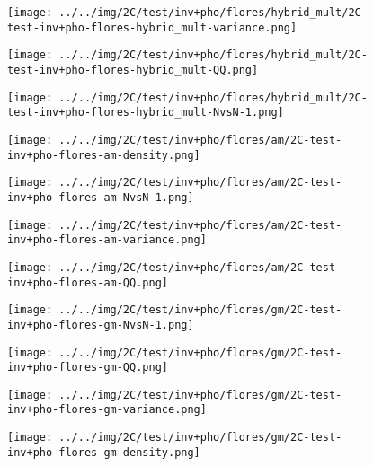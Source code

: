 \begin{figure}[H]
\centering	\texttt{[image: ../../img/2C/test/inv+pho/flores/hybrid\_mult/2C-test-inv+pho-flores-hybrid\_mult-variance.png]}
\end{figure}
\begin{figure}[H]
\centering	\texttt{[image: ../../img/2C/test/inv+pho/flores/hybrid\_mult/2C-test-inv+pho-flores-hybrid\_mult-QQ.png]}
\end{figure}
\begin{figure}[H]
\centering	\texttt{[image: ../../img/2C/test/inv+pho/flores/hybrid\_mult/2C-test-inv+pho-flores-hybrid\_mult-NvsN-1.png]}
\end{figure}
\begin{figure}[H]
\centering	\texttt{[image: ../../img/2C/test/inv+pho/flores/am/2C-test-inv+pho-flores-am-density.png]}
\end{figure}
\begin{figure}[H]
\centering	\texttt{[image: ../../img/2C/test/inv+pho/flores/am/2C-test-inv+pho-flores-am-NvsN-1.png]}
\end{figure}
\begin{figure}[H]
\centering	\texttt{[image: ../../img/2C/test/inv+pho/flores/am/2C-test-inv+pho-flores-am-variance.png]}
\end{figure}
\begin{figure}[H]
\centering	\texttt{[image: ../../img/2C/test/inv+pho/flores/am/2C-test-inv+pho-flores-am-QQ.png]}
\end{figure}
\begin{figure}[H]
\centering	\texttt{[image: ../../img/2C/test/inv+pho/flores/gm/2C-test-inv+pho-flores-gm-NvsN-1.png]}
\end{figure}
\begin{figure}[H]
\centering	\texttt{[image: ../../img/2C/test/inv+pho/flores/gm/2C-test-inv+pho-flores-gm-QQ.png]}
\end{figure}
\begin{figure}[H]
\centering	\texttt{[image: ../../img/2C/test/inv+pho/flores/gm/2C-test-inv+pho-flores-gm-variance.png]}
\end{figure}
\begin{figure}[H]
\centering	\texttt{[image: ../../img/2C/test/inv+pho/flores/gm/2C-test-inv+pho-flores-gm-density.png]}
\end{figure}
